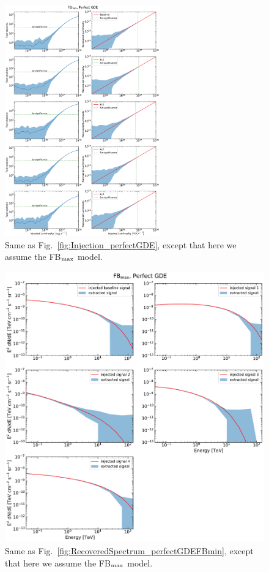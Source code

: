 \documentclass[doublespace,nopageskip]{VTthesis}
\begin{document}
 \begin{figure}
    \begin{center}
    \includegraphics[width=0.6\textwidth]{Figures/CTA/all-TS-mis-False-Fermi-min-False.pdf}
    \caption{Same as Fig.~\ref{fig:Injection_perfectGDE}, except that here we assume the FB$_{\rm max}$ model.}\label{fig:Injection_perfectGDEFBmax}
    \end{center}
\end{figure}

\begin{figure}
    \begin{center}
    \includegraphics[width=\textwidth]{Figures/CTA/all-signal-spectra-mis-False-Fermi-min-False.pdf}
    \caption{Same as Fig.~\ref{fig:RecoveredSpectrum_perfectGDEFBmin}, except that here we assume the FB$_{\rm max}$ model. }\label{fig:RecoveredSpectrum_perfectGDEFBmax}
    \end{center}
\end{figure}
\end{document}
